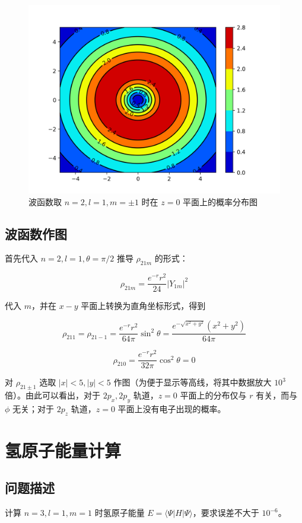 \documentclass{ctexart}
\begin{document}
\begin{figure}[h]
\centering
\includegraphics[scale = 0.8]{r11.png}
\caption{波函数取 $n=2, l=1, m=\pm1$ 时在 $z=0$ 平面上的概率分布图}
\end{figure}
\subsection{波函数作图}
首先代入 $n=2, l=1, \theta=\pi/2$ 推导 $\rho_{21m}$ 的形式：

\[
\rho_{21m}=\frac{e^{-r}r^2}{24}|Y_{1m}|^2
\]

代入 $m$，并在 $x-y$ 平面上转换为直角坐标形式，得到

\[
\rho_{211}=\rho_{21-1}=\frac{e^{-r}r^2}{64\pi}\sin^2\theta=\frac{e^{-\sqrt{x^2+y^2}}(x^2+y^2)}{64\pi}
\]

\[
\rho_{210}=\frac{e^{-r}r^2}{32\pi}\cos^2\theta= 0
\]

对 $\rho_{21\pm1}$ 选取 $|x|<5, |y|<5$ 作图（为便于显示等高线，将其中数据放大 $10^3$ 倍）。由此可以看出，对于 $2p_x,2p_y$ 轨道，$z=0$ 平面上的分布仅与 $r$ 有关，而与 $\phi$ 无关；对于 $2p_z$ 轨道，$z=0$ 平面上没有电子出现的概率。

\newpage

\section{氢原子能量计算}
\subsection{问题描述}
计算 $n=3,l=1,m=1$ 时氢原子能量 $E=\langle\Psi|H|\Psi\rangle$，要求误差不大于 $10^{-6}$。
\end{document}
